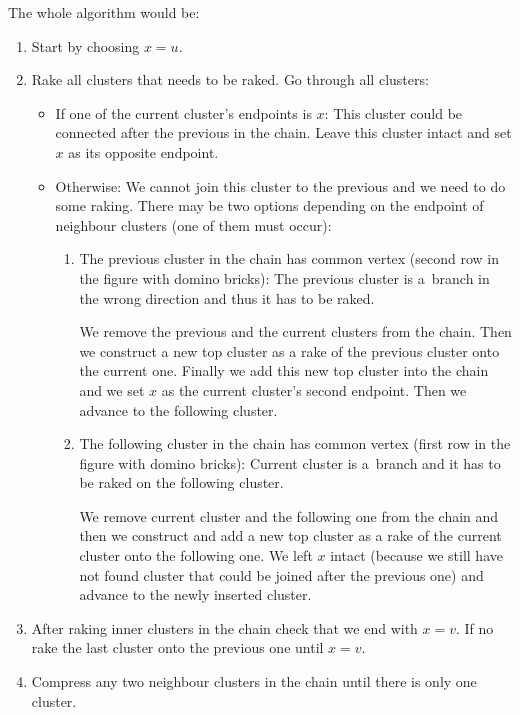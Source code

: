 The whole algorithm would be:
\begin{enumerate}

\item Start by choosing $x=u$.

\item Rake all clusters that needs to be raked. Go through all clusters:
\begin{itemize}
\item {\I If one of the current cluster's endpoints is $x$:} This cluster
could be connected after the previous in the chain. Leave this cluster intact
and set $x$ as its opposite endpoint.
\item {\I Otherwise:} We cannot join this cluster to the previous and we need to
do some raking. There may be two options depending on the endpoint of neighbour
clusters (one of them must occur):
\begin{enumerate}

	\item {\I The previous cluster in the chain has common vertex (second
	row in the figure with domino bricks):} The previous cluster is a~branch
	in the wrong direction and thus it has to be raked.

	We remove the previous and the current clusters from the chain. Then we
	construct a new top cluster as a rake \Join{} of the previous cluster
	onto the current one. Finally we add this new top cluster into the chain
	and we set $x$ as the current cluster's second endpoint. Then we advance
	to the following cluster.

	\item {\I The following cluster in the chain has common vertex (first
	row in the figure with domino bricks):} Current cluster is a~branch and
	it has to be raked on the following cluster.

	We remove current cluster and the following one from the chain and then
	we construct and add a new top cluster as a rake \Join{} of the current
	cluster onto the following one. We left $x$ intact (because we still
	have not found cluster that could be joined after the previous one) and
	advance to the newly inserted cluster.

\end{enumerate}

\end{itemize}

\item After raking inner clusters in the chain check that we end with $x=v$. If
no rake the last cluster onto the previous one until $x=v$.

\item Compress \Join{} any two neighbour clusters in the chain until there is
only one cluster.

\end{enumerate}

